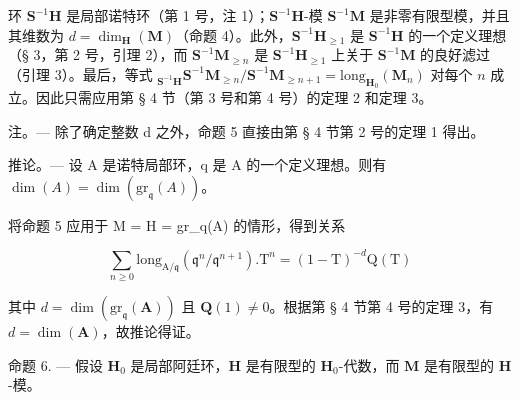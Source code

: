 环 \(\mathbf{S}^{-1}\mathbf{H}\) 是局部诺特环（第 1 号，注 1）；\(\mathbf{S}^{-1}\mathbf{H}\)-模 \(\mathbf{S}^{-1}\mathbf{M}\) 是非零有限型模，并且其维数为 \(d = \dim_{\mathbf{H}}(\mathbf{M})\)（命题 4）。此外，\(\mathbf{S}^{-1}\mathbf{H}_{\geqslant 1}\) 是 \(\mathbf{S}^{-1}\mathbf{H}\) 的一个定义理想（§ 3，第 2 号，引理 2），而 \(\mathbf{S}^{-1}\mathbf{M}_{\geqslant n}\) 是 \(\mathbf{S}^{-1}\mathbf{H}_{\geqslant 1}\) 上关于 \(\mathbf{S}^{-1}\mathbf{M}\) 的良好滤过（引理 3）。最后，等式 \(_{\mathbf{S}^{-1}\mathbf{H}}\mathbf{S}^{-1}\mathbf{M}_{\geqslant n}/\mathbf{S}^{-1}\mathbf{M}_{\geqslant n+1} = \text{long}_{\mathbf{H}_0}(\mathbf{M}_n)\) 对每个 \(n\) 成立。因此只需应用第 § 4 节（第 3 号和第 4 号）的定理 2 和定理 3。

注。--- 除了确定整数 d 之外，命题 5 直接由第 § 4 节第 2 号的定理 1 得出。

推论。--- 设 A 是诺特局部环，q 是 A 的一个定义理想。则有 \(\dim(A) = \dim(\text{gr}_{\mathfrak{q}}(A))\)。

将命题 5 应用于 M = H = gr\_q(A) 的情形，得到关系

\[
\sum_ {n \geqslant 0} \mathrm{long} _ {\mathrm{A} / \mathfrak {q}} (\mathfrak {q} ^ {n} / \mathfrak {q} ^ {n + 1}). \mathrm{T} ^ {n} = (1 - \mathrm{T}) ^ {- d} \mathrm{Q} (\mathrm{T})
\]

其中 \(d = \dim(\mathrm{gr}_{\mathfrak{q}}(\mathbf{A}))\) 且 \(\mathbf{Q}(1) \neq 0\)。根据第 § 4 节第 4 号的定理 3，有 \(d = \dim(\mathbf{A})\)，故推论得证。

命题 6. --- 假设 \(\mathbf{H}_{0}\) 是局部阿廷环，\(\mathbf{H}\) 是有限型的 \(\mathbf{H}_{0}\)-代数，而 \(\mathbf{M}\) 是有限型的 \(\mathbf{H}\)-模。


